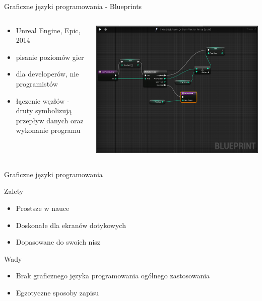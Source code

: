 \documentclass[presentation]{beamer}
\begin{document}
\begin{frame}[label=sec-1-4]{Graficzne języki programowania - Blueprints}
\begin{columns}
\begin{column}{0.4\textwidth}
\begin{itemize}
\item Unreal Engine, Epic, 2014
\item pisanie poziomów gier
\item dla developerów, nie programistów
\item łączenie węzłów - druty symbolizują przepływ danych oraz wykonanie programu
\end{itemize}
\end{column}
\begin{column}{0.6\textwidth}
\includegraphics[width=.9\linewidth]{./img/b-wires.png}
\end{column}
\end{columns}
\end{frame}
\begin{frame}[label=sec-1-5]{Graficzne języki programowania}
\begin{block}{Zalety}
\begin{itemize}
\item Prostsze w nauce
\item Doskonałe dla ekranów dotykowych
\item Dopasowane do swoich nisz
\end{itemize}
\end{block}
\begin{block}{Wady}
\begin{itemize}
\item Brak graficznego języka programowania ogólnego zastosowania
\item Egzotyczne sposoby zapisu
\end{itemize}
\end{block}
\end{frame}
\end{document}
